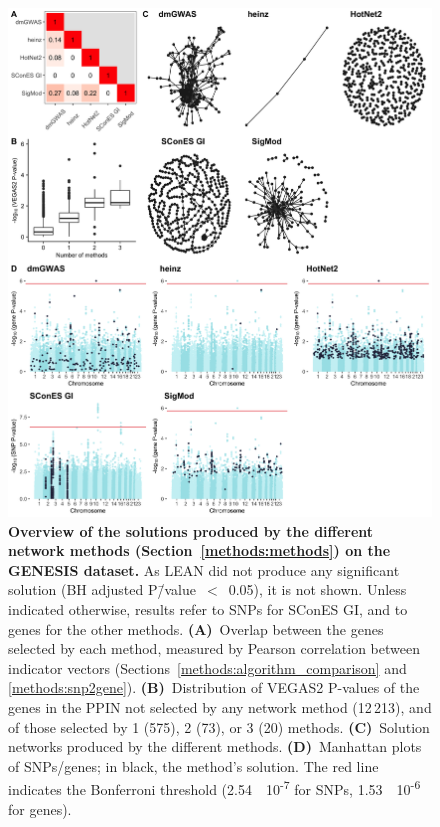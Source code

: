 \documentclass[10pt,letterpaper]{article}
\begin{document}
\begin{figure}[!ht]
  \centering
  \includegraphics[width=\textwidth]{./figures/figure_1.png}
  \caption{\textbf{Overview of the solutions produced by the different network methods (Section~\ref{methods:methods}) on the GENESIS dataset.} As LEAN did not produce any significant solution (BH adjusted P\=/value~$<$~0.05), it is not shown. Unless indicated otherwise, results refer to SNPs for SConES GI, and to genes for the other methods. \textbf{(A)}~Overlap between the genes selected by each method, measured by Pearson correlation between indicator vectors (Sections~\ref{methods:algorithm_comparison} and \ref{methods:snp2gene}). \textbf{(B)}~Distribution of VEGAS2 P-values of the genes in the PPIN not selected by any network method (12\,213), and of those selected by 1 (575), 2 (73), or 3 (20) methods. \textbf{(C)}~Solution networks produced by the different methods. \textbf{(D)}~Manhattan plots of SNPs/genes; in black, the method's solution. The red line indicates the Bonferroni threshold (2.54~\texttimes{}~10\textsuperscript{-7} for SNPs, 1.53~\texttimes{}~10\textsuperscript{-6} for genes).}
  \label{fig:solution_overview}
\end{figure}
\end{document}
